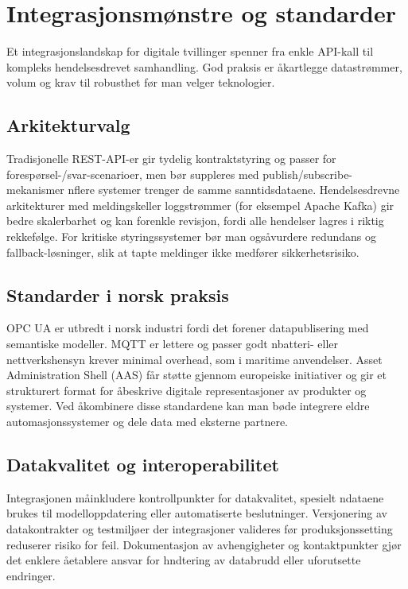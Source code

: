 \section{Integrasjonsm\o nstre og standarder}
Et integrasjonslandskap for digitale tvillinger spenner fra enkle API-kall til kompleks hendelsesdrevet samhandling. God praksis er \aa kartlegge datastr\o mmer, volum og krav til robusthet f\o r man velger teknologier.

\subsection{Arkitekturvalg}
Tradisjonelle REST-API-er gir tydelig kontraktstyring og passer for foresp\o rsel-/svar-scenarioer, men b\o r suppleres med publish/subscribe-mekanismer n\aar flere systemer trenger de samme sanntidsdataene. Hendelsesdrevne arkitekturer med meldingsk\oer eller loggstr\o mmer (for eksempel Apache Kafka) gir bedre skalerbarhet og kan forenkle revisjon, fordi alle hendelser lagres i riktig rekkef\o lge. For kritiske styringssystemer b\o r man ogs\aa vurdere redundans og fallback-l\o sninger, slik at tapte meldinger ikke medf\o rer sikkerhetsrisiko.

\subsection{Standarder i norsk praksis}
OPC UA er utbredt i norsk industri fordi det forener datapublisering med semantiske modeller. MQTT er lettere og passer godt n\aar batteri- eller nettverkshensyn krever minimal overhead, som i maritime anvendelser. Asset Administration Shell (AAS) f\aa r st\o tte gjennom europeiske initiativer og gir et strukturert format for \aa beskrive digitale representasjoner av produkter og systemer. Ved \aa kombinere disse standardene kan man b\o de integrere eldre automasjonssystemer og dele data med eksterne partnere.

\subsection{Datakvalitet og interoperabilitet}
Integrasjonen m\aa inkludere kontrollpunkter for datakvalitet, spesielt n\aar dataene brukes til modelloppdatering eller automatiserte beslutninger. Versjonering av datakontrakter og testmilj\o er der integrasjoner valideres f\o r produksjonssetting reduserer risiko for feil. Dokumentasjon av avhengigheter og kontaktpunkter gj\o r det enklere \aa etablere ansvar for h\a ndtering av databrudd eller uforutsette endringer.

